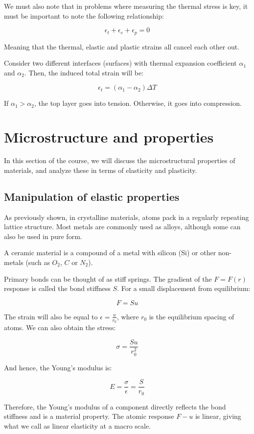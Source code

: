 \documentclass{article}
\begin{document}
We must also note that in problems where measuring the thermal stress is key, it must be important to note the following relationship:

\[ \epsilon_t + \epsilon_e + \epsilon_p = 0 \]

Meaning that the thermal, elastic and plastic strains all cancel each other out.

\begin{proposition}
    Consider two different interfaces (surfaces) with thermal expansion coefficient $\alpha_1$ and $\alpha_2$. Then, the induced total strain will be:

    \[ \epsilon_t = (\alpha_1 - \alpha_2)\Delta T \]

    If $\alpha_1 > \alpha_2$, the top layer goes into tension. Otherwise, it goes into compression.
\end{proposition}

\newpage

\section{Microstructure and properties}

In this section of the course, we will discuss the microstructural properties of materials, and analyze these in terms of elasticity and plasticity.

\subsection{Manipulation of elastic properties}

As previously shown, in crystalline materials, atoms pack in a regularly repeating lattice structure. Most metals are commonly used as alloys, although some can also be used in pure form.

\begin{definition}[Ceramic]
    A ceramic material is a compound of a metal with silicon (Si) or other non-metals (such as $O_2$, $C$ or $N_2$).
\end{definition}

\begin{proposition}
    Primary bonds can be thought of as stiff springs. The gradient of the $F = F(r)$ response is called the bond stiffness $S$. For a small displacement from equilibrium:

    \[ F = Su \]

    The strain will also be equal to $\epsilon = \frac{u}{r_0}$, where $r_0$ is the equilibrium spacing of atoms. We can also obtain the stress:

    \[ \sigma = \frac{Su}{r_0^2} \]

    And hence, the Young's modulus is:

    \[ E = \frac{\sigma}{\epsilon} = \frac{S}{r_0} \]

    Therefore, the Young's modulus of a component directly reflects the bond stiffness and is a material property. The atomic response $F - u$ is linear, giving what we call as linear elasticity at a macro scale.
\end{proposition}
\end{document}
